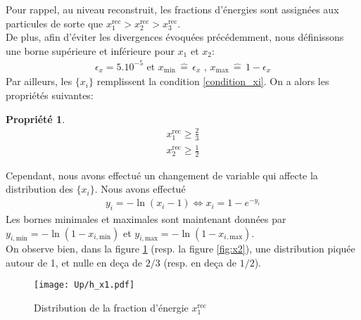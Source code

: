 \documentclass[a4paper]{article} %
\numberwithin{equation}{section} %
\theoremstyle{definition}
\theoremstyle{remark}
\theoremstyle{plain}%
\newtheorem{prop}{Propriété}[section]
\theoremstyle{style_exemple}
\newenvironment{formal_prop}{%
  \def\FrameCommand{%
    \hspace{1pt}%
    {\color{Thistle}\vrule width 2pt}%
    {\color{thmshade}\vrule width 4pt}%
    \colorbox{thmshade}%
  }%
  \MakeFramed{\advance\hsize-\width\FrameRestore}%
  \noindent\hspace{-4.55pt}%
  \begin{adjustwidth}{}{7pt}%
  \vspace{2pt}\vspace{2pt}%
}
{%
  \vspace{2pt}\end{adjustwidth}\endMakeFramed%
}
\newcommand{\colprop}[1]{\begin{formal_prop}
    \begin{prop}
        #1
    \end{prop}
\end{formal_prop}}
\newcommand\eqdef{\, \widehat{=} \, }
\begin{document}
Pour rappel, au niveau reconstruit, les fractions d'énergies sont assignées aux particules de sorte que $x^\text{rec}_1>x^\text{rec}_2>x^\text{rec}_3$. \\
De plus, afin d'éviter les divergences évoquées précédemment, nous définissons une borne supérieure et inférieure pour $x_1$ et $x_2$:
\begin{align*}
    \epsilon_x = 5.10^{-5} \text{ et } x_\text{min} \eqdef \epsilon_x \text{ , } x_\text{max} \eqdef 1 - \epsilon_x
\end{align*}
Par ailleurs, les $\{x_i\}$ remplissent la condition \eqref{condition_xi}. On a alors les propriétés suivantes:
\colprop{
\begin{align*}
    x^\text{rec}_1 \geq \frac{2}{3}\\
    x^\text{rec}_2 \geq \frac{1}{2}
\end{align*}
}

Cependant, nous avons effectué un changement de variable qui affecte la distribution des $\{x_i\}$. Nous avons effectué
\begin{align*}
    y_i = -\ln{(x_i-1)} \iff x_i = 1 - e^{-y_i}
\end{align*}
Les bornes minimales et maximales sont maintenant données par $y_{i,\text{min}} = - \ln{(1 - x_{i,\text{min}})}$ et $y_{i,\text{max}} = - \ln{(1 - x_{i,\text{max}})}$. \\
On observe bien, dans la figure \ref{fig:x1} (resp. la figure \ref{fig:x2}), une distribution piquée autour de 1, et nulle en deça de $2/3$ (resp. en deça de $1/2$).

\begin{figure}[H]
    \centering
    \texttt{[image: Up/h\_x1.pdf]}
    \begin{minipage}{12cm}
        \caption{Distribution de la fraction d'énergie $x^\text{rec}_1$ }
        \label{fig:x1}
    \end{minipage}
\end{figure}
\end{document}
